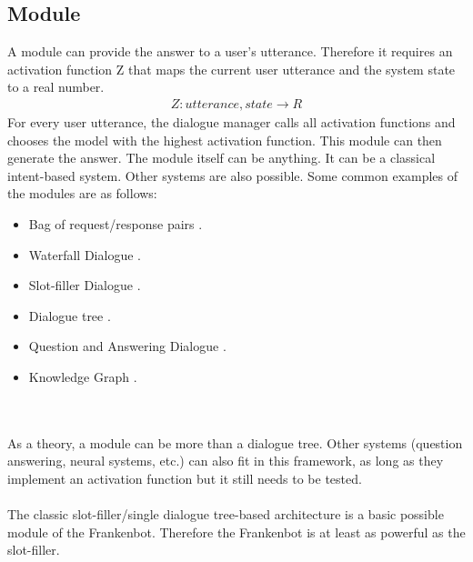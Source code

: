 \subsection{Module}
A module can provide the answer to a user's utterance. Therefore it requires an activation function Z that maps the current user utterance and the system state to a real number.
\begin{align*}
 Z: utterance, state \rightarrow R
\end{align*} 
For every user utterance, the dialogue manager calls all activation functions and chooses the model with the highest activation function. This module can then generate the answer. The module itself can be anything. It can be a classical intent-based system. Other systems are also possible. Some common examples of the modules are as follows:
\begin{itemize}
\item Bag of request/response pairs \cite{rrpairs}.
\item Waterfall Dialogue \cite{waterfallDial}.       
\item Slot-filler Dialogue \cite{slotfillerDial}.
\item Dialogue tree \cite{dialogTree}.
\item Question and Answering Dialogue \cite{q&aDialog}.
\item Knowledge Graph \cite{knowlGraph}.
\end{itemize}
\\~\\
As a theory, a module can be more than a dialogue tree. Other systems (question answering, neural systems, etc.) can also fit in this framework, as long as they implement an activation function but it still needs to be tested. 
\\~\\
The classic slot-filler/single dialogue tree-based architecture is a basic possible module of the Frankenbot. Therefore the Frankenbot is at least as powerful as the slot-filler.

